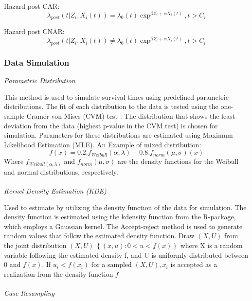Hazard post CAR: 
\begin{equation} \label{eq:carassmp}\lambda_{post}(t|Z_{i},X_{i}(t)) = \lambda_{0}(t)\exp^{\beta Z_{i} + \alpha X_{i}(t)}, t>C_{i}\end{equation}

Hazard post CNAR:
\begin{equation} \label{eq:cnarassmp}\lambda_{post}(t|Z_{i},X_{i}(t)) \neq \lambda_{0}(t)\exp^{\beta Z_{i} + \alpha X_{i}(t)}, t>C_{i}\end{equation}

\subsubsection*{Data Simulation}
\textit{Parametric Distribution}
\par \noindent This method is used to simulate survival times using predefined parametric distributions. The fit of each distribution to the data is tested using the one-sample Cramér-von Mises (CVM) test \parencite{thurow_how_2023}. The distribution that shows the least deviation from the data (highest p-value in the CVM test) is chosen for simulation. Parameters for these distributions are estimated using Maximum Likelihood Estimation (MLE). An Example of mixed distribution: 
\begin{equation} \label{eq:paramdist}f(x)=0.2.f_{Weibull}(\alpha,\lambda)+0.8.f_{norm}(\mu,\sigma)(x)\end{equation}
\noindent Where \(f_{Weibull(\alpha, \lambda)}\) and \(f_{norm}(\mu,\sigma)\) are the density functions for the Weibull and normal distributions, respectively.
\\\\
\textit{Kernel Density Estimation (KDE)}
\par \noindent Used to estimate by utilizing the density function of the data for simulation. The density function is estimated using the kdensity function from the \parencite{thurow_how_2023} R-package, which employs a Gaussian kernel. The Accept-reject method is used to generate random values that follow the estimated density function. Draw \((X, U)\) from the joint distribution \((X, U) ~ \left\{ (x,u):0<u<f(x)\right\}\) where X is a random variable following the estimated density f, and U is uniformly distributed between 0 and \(f(x)\). If \(u_{i} < f(x_{i})\) for a sampled \((X,U),x_{i}\) is accepted as a realization from the density function \(f\)
\\\\
\textit{Case Resampling}
